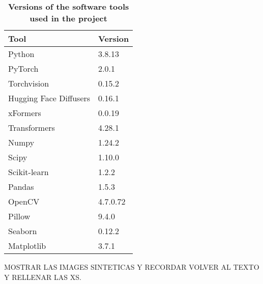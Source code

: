 \begin{table}[ht]
\centering
\begin{tabular}{|l|l|}
\hline
\rowcolor[HTML]{BFBFBF} 
\textbf{Tool} & \textbf{Version} \\ \hline
\rowcolor[HTML]{FFFFFF} 
Python & 3.8.13 \\ \hline
\rowcolor[HTML]{FFFFFF} 
PyTorch & 2.0.1 \\ \hline
\rowcolor[HTML]{FFFFFF} 
Torchvision & 0.15.2 \\ \hline
\rowcolor[HTML]{FFFFFF} 
Hugging Face Diffusers & 0.16.1 \\ \hline
\rowcolor[HTML]{FFFFFF} 
xFormers & 0.0.19 \\ \hline
\rowcolor[HTML]{FFFFFF} 
Transformers & 4.28.1 \\ \hline
\rowcolor[HTML]{FFFFFF} 
Numpy & 1.24.2 \\ \hline
\rowcolor[HTML]{FFFFFF} 
Scipy & 1.10.0 \\ \hline
\rowcolor[HTML]{FFFFFF} 
Scikit-learn & 1.2.2 \\ \hline
\rowcolor[HTML]{FFFFFF} 
Pandas & 1.5.3 \\ \hline
\rowcolor[HTML]{FFFFFF} 
OpenCV & 4.7.0.72 \\ \hline
\rowcolor[HTML]{FFFFFF} 
Pillow & 9.4.0 \\ \hline
\rowcolor[HTML]{FFFFFF} 
Seaborn & 0.12.2 \\ \hline
\rowcolor[HTML]{FFFFFF} 
Matplotlib & 3.7.1 \\ \hline
\end{tabular}
\caption{\textbf{Versions of the software tools used in the project}}
\label{table:TableHSoftware}
\end{table}



MOSTRAR LAS IMAGES SINTETICAS Y RECORDAR VOLVER AL TEXTO Y RELLENAR LAS XS.